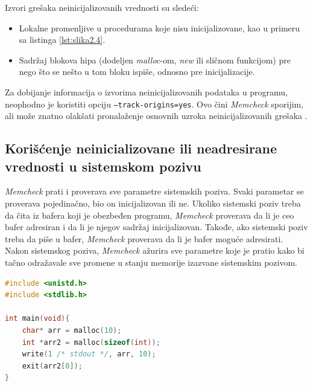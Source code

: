 \documentclass[12pt,oneside]{memoir}
\theoremstyle{plain}
\theoremstyle{definition}
\begin{document}
Izvori grešaka neinicijalizovanih vrednosti su sledeći:
\begin{itemize}
\item Lokalne promenljive u procedurama koje nisu inicijalizovane, kao u primeru sa listinga \ref{lst:slika2.4}.
\item Sadržaj blokova hipa (dodeljen \textit{malloc}-om, \textit{new} ili sličnom funkcijom) pre nego što se nešto u tom bloku ispiše, odnosno pre inicijalizacije.
\end{itemize}

Za dobijanje informacija o izvorima neinicijalizovanih podataka u programu, neophodno je koristiti opciju \texttt{--track-origins=yes}. Ovo čini \textit{Memcheck} sporijim, ali može znatno olakšati pronalaženje osnovnih uzroka neinicijalizovanih grešaka \cite{ValgrindDOC}. 

\subsection{Korišćenje neinicializovane ili neadresirane vrednosti u sistemskom pozivu}

\textit{Memcheck} prati i proverava sve parametre sistemskih poziva. Svaki parametar se proverava pojedinačno, bio on inicijalizovan ili ne. Ukoliko sistemski poziv treba da čita iz bafera  koji je obezbeđen programu, \textit{Memcheck} proverava da li je ceo bafer adresiran i da li je njegov sadržaj inicijalizovan. Takođe, ako sistemski poziv treba da piše u bafer, \textit{Memcheck} proverava da li je bafer moguće adresirati. Nakon sistemskog poziva, \textit{Memcheck} ažurira sve parametre koje je pratio kako bi tačno odražavale sve promene u stanju memorije izazvane sistemskim pozivom.

\begin{lstlisting}[style=mystyle,caption={Program koji izaziva grešku korišćenja neinicializovane ili neadresirane vrednosti u sistemskom pozivu \cite{Memcheck}}, label={lst:slika2.6},language={C}] 
#include <unistd.h>
#include <stdlib.h>

int main(void){
	char* arr = malloc(10);
	int *arr2 = malloc(sizeof(int));
	write(1 /* stdout */, arr, 10);
	exit(arr2[0]);
}
\end{lstlisting}

\end{document}
